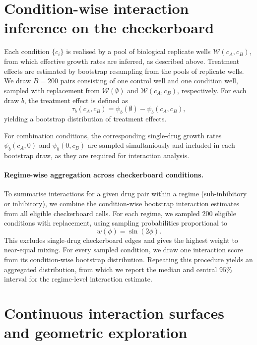 \section{Condition-wise interaction inference on the checkerboard}\label{ssec:bootstrap_interactions}
Each condition \(\{c_i\}\) is realised by a pool of biological replicate wells \(\mathcal{W}(c_A, c_B)\), from which effective growth rates are inferred, as described above.
Treatment effects are estimated by bootstrap resampling from the pools of replicate wells.
We draw \(B=200\) pairs consisting of one control well and one condition well, sampled with replacement from \(\mathcal{W}(\emptyset)\) and \(\mathcal{W}(c_A,c_B)\), respectively.
For each draw \(b\), the treatment effect is defined as
\[
  \tau_b(c_A,c_B) =
  \psi_b(\emptyset)-\psi_b(c_A,c_B),
\]
yielding a bootstrap distribution of treatment effects.

For combination conditions, the corresponding single-drug  growth rates \(\psi_b(c_A,0)\) and \(\psi_b(0,c_B)\) are sampled simultaniously  and included in each bootstrap draw, as they are required for interaction analysis.

\paragraph{Regime-wise aggregation across checkerboard conditions.}
To summarise interactions for a given drug pair within a regime (sub-inhibitory or inhibitory), we combine the condition-wise bootstrap interaction estimates from all eligible checkerboard cells.
For each regime, we sampled 200 eligible conditions with replacement, using sampling probabilities proportional to
\begin{equation}
  w(\phi)=\sin(2\phi).
  \label{eq:weights}
\end{equation}
This excludes single-drug checkerboard edges and gives the highest weight to near-equal mixing.
For every sampled condition, we draw one interaction score from its condition-wise bootstrap distribution.
Repeating this procedure yields an aggregated distribution, from which we report the median and central \(95\%\) interval for the regime-level interaction estimate.

\section{Continuous interaction surfaces and geometric exploration}\label{ssec:surface}


